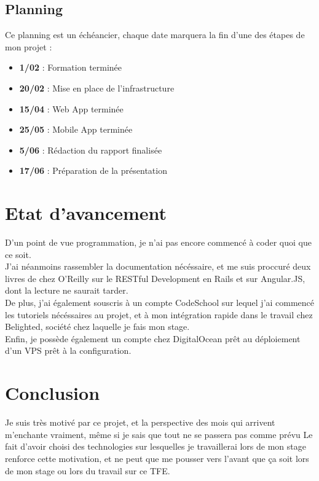 \documentclass{report}
\begin{document}
	\subsection{Planning}

		Ce planning est un échéancier, chaque date marquera la fin d'une des étapes de mon projet : \\

		\begin{itemize}
			\item \textbf{1/02} : Formation terminée
			\item \textbf{20/02} : Mise en place de l'infrastructure
			\item \textbf{15/04} : Web App terminée
			\item \textbf{25/05} : Mobile App terminée
			\item \textbf{5/06} : Rédaction du rapport finalisée
			\item \textbf{17/06} : Préparation de la présentation\\
		\end{itemize}


\section{Etat d'avancement}

	D'un point de vue programmation, je n'ai pas encore commencé à coder quoi que ce soit.\\

	J'ai néanmoins rassembler la documentation nécéssaire, et me suis proccuré deux livres de chez O'Reilly sur le RESTful Development en Rails et sur Angular.JS, dont la lecture ne saurait tarder.\\

	De plus, j'ai également souscris à un compte CodeSchool sur lequel j'ai commencé les tutoriels nécéssaires au projet, et à mon intégration rapide dans le travail chez Belighted, société chez laquelle je fais mon stage.\\

	Enfin, je possède également un compte chez DigitalOcean prêt au déploiement d'un VPS prêt à la configuration.\\

\section{Conclusion}

	Je suis très motivé par ce projet, et la perspective des mois qui arrivent m'enchante vraiment, même si je sais que tout ne se passera pas comme prévu
	Le fait d'avoir choisi des technologies sur lesquelles je travaillerai lors de mon stage renforce cette motivation, et ne peut que me pousser vers l'avant que ça soit lors de mon stage ou lors du travail sur ce TFE.\\
\end{document}
